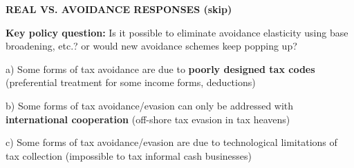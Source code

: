 \documentclass[landscape]{slides}
\begin{document}
\begin{slide}
\begin{center}
{\bf REAL VS. AVOIDANCE RESPONSES (skip)}
\end{center}
{\bf Key policy question:} Is it possible to eliminate avoidance elasticity using base broadening, etc.? or would new avoidance schemes keep popping up?

a) Some forms of tax avoidance are due to \textbf{poorly designed tax codes} (preferential treatment for some income forms, deductions)

b) Some forms of tax avoidance/evasion can only be addressed with \textbf{international cooperation} (off-shore
tax evasion in tax heavens)

c) Some forms of tax avoidance/evasion are due to technological limitations of tax collection
(impossible to tax informal cash businesses)

\end{slide}


%
%
%
%
%
%
%
%
%
%
\end{document}
